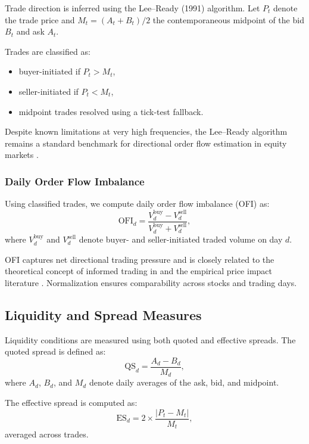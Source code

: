 Trade direction is inferred using the Lee--Ready (1991) algorithm. Let $P_t$
denote the trade price and $M_t = (A_t + B_t)/2$ the contemporaneous midpoint of
the bid $B_t$ and ask $A_t$.

Trades are classified as:
\begin{itemize}
    \item buyer-initiated if $P_t > M_t$,
    \item seller-initiated if $P_t < M_t$,
    \item midpoint trades resolved using a tick-test fallback.
\end{itemize}

Despite known limitations at very high frequencies, the Lee--Ready algorithm
remains a standard benchmark for directional order flow estimation in equity
markets \citep{LeeReady1991,OddersWhite2000,Hasbrouck2007}.

\subsubsection{Daily Order Flow Imbalance}

Using classified trades, we compute daily order flow imbalance (OFI) as:
\begin{equation}
\text{OFI}_d = 
\frac{V^{\text{buy}}_d - V^{\text{sell}}_d}
     {V^{\text{buy}}_d + V^{\text{sell}}_d},
\end{equation}
where $V^{\text{buy}}_d$ and $V^{\text{sell}}_d$ denote buyer- and seller-initiated
traded volume on day $d$.

OFI captures net directional trading pressure and is closely related to the
theoretical concept of informed trading in \citet{Kyle1985} and the empirical
price impact literature \citep{Hasbrouck1991}. Normalization ensures
comparability across stocks and trading days.

\subsection{Liquidity and Spread Measures}

Liquidity conditions are measured using both quoted and effective spreads.
The quoted spread is defined as:
\begin{equation}
\text{QS}_d = \frac{A_d - B_d}{M_d},
\end{equation}
where $A_d$, $B_d$, and $M_d$ denote daily averages of the ask, bid, and midpoint.

The effective spread is computed as:
\begin{equation}
\text{ES}_d = 2 \times \frac{|P_t - M_t|}{M_t},
\end{equation}
averaged across trades.

